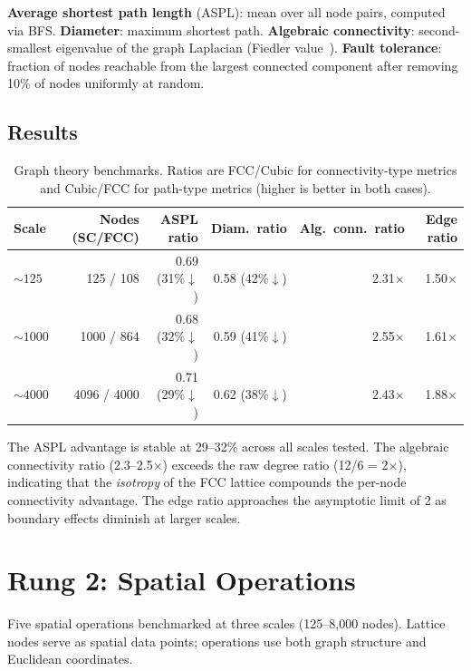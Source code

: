 \documentclass[11pt]{article}
\begin{document}
\textbf{Average shortest path length} (ASPL): mean over all
node pairs, computed via BFS. \textbf{Diameter}: maximum
shortest path. \textbf{Algebraic connectivity}: second-smallest
eigenvalue of the graph Laplacian (Fiedler
value~\cite{fiedler1973}). \textbf{Fault tolerance}: fraction
of nodes reachable from the largest connected component after
removing 10\% of nodes uniformly at random.

\subsection{Results}

\begin{table}[H]
\centering
\caption{Graph theory benchmarks. Ratios are FCC/Cubic for
connectivity-type metrics and Cubic/FCC for path-type metrics
(higher is better in both cases).}
\label{tab:graph}
\begin{tabular}{lrrrrr}
\toprule
Scale & Nodes (SC/FCC) & ASPL ratio & Diam.\ ratio
  & Alg.\ conn.\ ratio & Edge ratio \\
\midrule
${\sim}125$  & 125 / 108   & 0.69 (31\%$\downarrow$)
  & 0.58 (42\%$\downarrow$) & 2.31$\times$ & 1.50$\times$ \\
${\sim}1000$ & 1000 / 864  & 0.68 (32\%$\downarrow$)
  & 0.59 (41\%$\downarrow$) & 2.55$\times$ & 1.61$\times$ \\
${\sim}4000$ & 4096 / 4000 & 0.71 (29\%$\downarrow$)
  & 0.62 (38\%$\downarrow$) & 2.43$\times$ & 1.88$\times$ \\
\bottomrule
\end{tabular}
\end{table}

The ASPL advantage is stable at 29--32\% across all scales
tested. The algebraic connectivity ratio (2.3--2.5$\times$)
exceeds the raw degree ratio (12/6 = 2$\times$), indicating
that the \emph{isotropy} of the FCC lattice compounds the
per-node connectivity advantage. The edge ratio approaches the
asymptotic limit of 2 as boundary effects diminish at larger
scales.

\section{Rung 2: Spatial Operations}
\label{sec:spatial}

Five spatial operations benchmarked at three scales (125--8{,}000
nodes). Lattice nodes serve as spatial data points; operations
use both graph structure and Euclidean coordinates.
\end{document}
